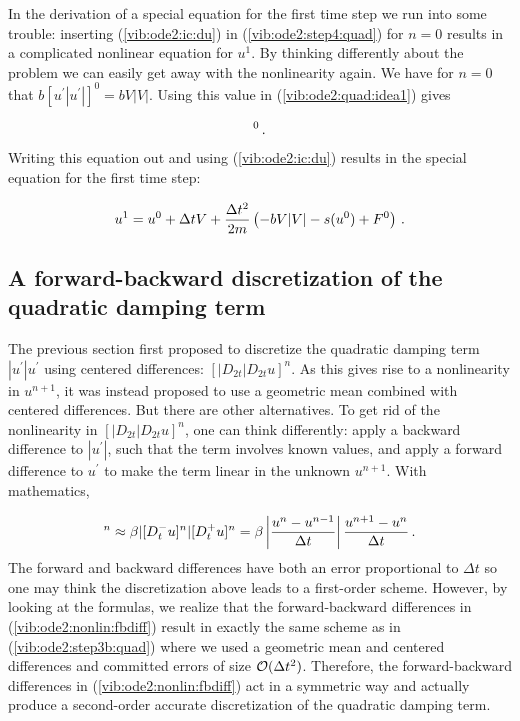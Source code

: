 \documentclass[%
oneside,                 %
final,                   %
10pt]{article}
\begin{document}

In the derivation of a special equation for the first
time step we run into some trouble: inserting (\ref{vib:ode2:ic:du})
in (\ref{vib:ode2:step4:quad}) for $n=0$ results in a complicated nonlinear
equation for $u^1$. By thinking differently about the problem we can
easily get away with the nonlinearity again. We have for $n=0$ that
$b[u^{\prime}|u^{\prime}|]^0 = bV|V|$. Using this value in (\ref{vib:ode2:quad:idea1})
gives

\begin{equation}
[mD_tD_t u + bV|V| + s(u) = F]^0
\tp
\end{equation}
Writing this equation out and using (\ref{vib:ode2:ic:du}) results in the
special equation for the first time step:

\begin{equation}
u^1 = u^0 + \Delta t V + \frac{\Delta t^2}{2m}\left(-bV|V| - s(u^0) + F^0\right)
\tp
\label{vib:ode2:step4b:quad}
\end{equation}

\subsection{A forward-backward discretization of the quadratic damping term}

The previous section first proposed to discretize the quadratic
damping term $|u^{\prime}|u^{\prime}$ using centered differences:
$[|D_{2t}|D_{2t}u]^n$. As this gives rise to a nonlinearity in
$u^{n+1}$, it was instead proposed to use a geometric mean combined
with centered differences.  But there are other alternatives. To get
rid of the nonlinearity in $[|D_{2t}|D_{2t}u]^n$, one can think
differently: apply a backward difference to $|u^{\prime}|$, such that
the term involves known values, and apply a forward difference to
$u^{\prime}$ to make the term linear in the unknown $u^{n+1}$. With
mathematics,

\begin{equation}
[\beta |u^{\prime}|u^{\prime}]^n \approx \beta |[D_t^-u]^n|[D_t^+ u]^n =
\beta\left\vert\frac{u^n-u^{n-1}}{\Delta t}\right\vert
\frac{u^{n+1}-u^n}{\Delta t}\tp
\label{vib:ode2:nonlin:fbdiff}
\end{equation}
The forward and backward differences have both an error proportional
to $\Delta t$ so one may think the discretization above leads to
a first-order scheme.
However, by looking at the formulas, we realize that the forward-backward
differences in (\ref{vib:ode2:nonlin:fbdiff})
result in exactly the same scheme as in
(\ref{vib:ode2:step3b:quad}) where we
used a geometric mean and centered differences and committed errors
of size $\Oof{\Delta t^2}$. Therefore, the forward-backward
differences in (\ref{vib:ode2:nonlin:fbdiff})
act in a symmetric way and actually produce a second-order
accurate discretization of the quadratic damping term.
\end{document}
